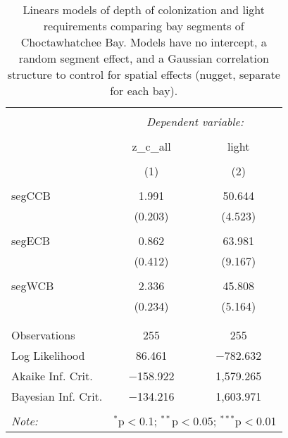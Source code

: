 \documentclass[letterpaper,12pt]{article}\usepackage[]{graphicx}\usepackage[]{color}
\begin{document}
\begin{table}[!htbp] \centering 
  \caption{Linears models of depth of colonization and light requirements comparing bay segments of Choctawhatchee Bay.  Models have no intercept, a random segment effect, and a Gaussian correlation structure to control for spatial effects (nugget, separate for each bay).} 
  \label{} 
\begin{tabular}{@{\extracolsep{5pt}}lcc} 
\\[-1.8ex]\hline 
\hline \\[-1.8ex] 
 & \multicolumn{2}{c}{\textit{Dependent variable:}} \\ 
\cline{2-3} 
\\[-1.8ex] & z\_c\_all & light \\ 
\\[-1.8ex] & (1) & (2)\\ 
\hline \\[-1.8ex] 
 segCCB & 1.991 & 50.644 \\ 
  & (0.203) & (4.523) \\ 
  & & \\ 
 segECB & 0.862 & 63.981 \\ 
  & (0.412) & (9.167) \\ 
  & & \\ 
 segWCB & 2.336 & 45.808 \\ 
  & (0.234) & (5.164) \\ 
  & & \\ 
\hline \\[-1.8ex] 
Observations & 255 & 255 \\ 
Log Likelihood & 86.461 & $-$782.632 \\ 
Akaike Inf. Crit. & $-$158.922 & 1,579.265 \\ 
Bayesian Inf. Crit. & $-$134.216 & 1,603.971 \\ 
\hline 
\hline \\[-1.8ex] 
\textit{Note:}  & \multicolumn{2}{r}{$^{*}$p$<$0.1; $^{**}$p$<$0.05; $^{***}$p$<$0.01} \\ 
\end{tabular} 
\end{table} 
\end{document}
